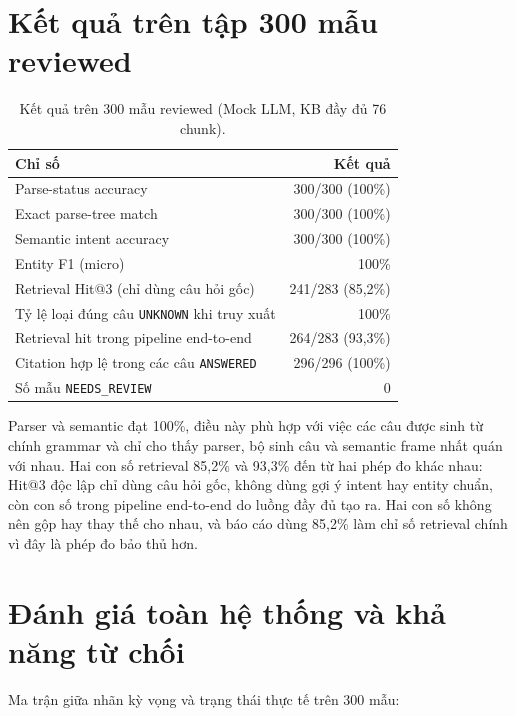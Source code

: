 \section{Kết quả trên tập 300 mẫu reviewed}

\begin{table}[H]
\centering
\small
\begin{tabular}{@{}lr@{}}
\toprule
Chỉ số & Kết quả \\
\midrule
Parse-status accuracy & 300/300 (100\%) \\
Exact parse-tree match & 300/300 (100\%) \\
Semantic intent accuracy & 300/300 (100\%) \\
Entity F1 (micro) & 100\% \\
Retrieval Hit@3 (chỉ dùng câu hỏi gốc) & 241/283 (85,2\%) \\
Tỷ lệ loại đúng câu \texttt{UNKNOWN} khi truy xuất & 100\% \\
Retrieval hit trong pipeline end-to-end & 264/283 (93,3\%) \\
Citation hợp lệ trong các câu \texttt{ANSWERED} & 296/296 (100\%) \\
Số mẫu \texttt{NEEDS\_REVIEW} & 0 \\
\bottomrule
\end{tabular}
\caption{Kết quả trên 300 mẫu reviewed (Mock LLM, KB đầy đủ 76 chunk).}
\end{table}

Parser và semantic đạt 100\%, điều này phù hợp với việc các câu được sinh từ chính grammar và chỉ cho thấy parser, bộ sinh câu và semantic frame nhất quán với nhau. Hai con số retrieval 85,2\% và 93,3\% đến từ hai phép đo khác nhau: Hit@3 độc lập chỉ dùng câu hỏi gốc, không dùng gợi ý intent hay entity chuẩn, còn con số trong pipeline end-to-end do luồng đầy đủ tạo ra. Hai con số không nên gộp hay thay thế cho nhau, và báo cáo dùng 85,2\% làm chỉ số retrieval chính vì đây là phép đo bảo thủ hơn.

\section{Đánh giá toàn hệ thống và khả năng từ chối}
\label{sec:eval-answerability}

Ma trận giữa nhãn kỳ vọng và trạng thái thực tế trên 300 mẫu:

